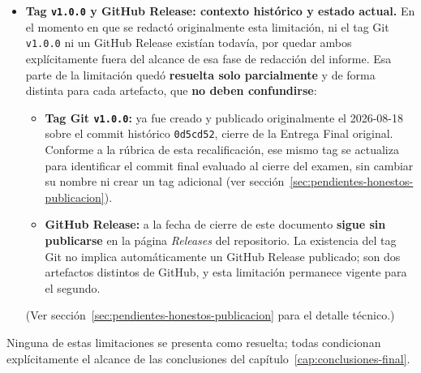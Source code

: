 \begin{itemize}[nosep]
    el diagrama de flujo ya fue regenerado con los tres bloques
    cuantificados; el \'unico gap que persiste es que Jaime no document\'o
    su conteo de candidatos evaluados/excluidos, se\~nalado con l\'inea
    punteada en el propio diagrama (cap\'itulo~\ref{cap:trabajos-relacionados}).
  \item \textbf{Tag \texttt{v1.0.0} y GitHub Release: contexto hist\'orico
    y estado actual.} En el momento en que se redact\'o originalmente esta
    limitaci\'on, ni el tag Git \texttt{v1.0.0} ni un GitHub Release
    exist\'ian todav\'ia, por quedar ambos expl\'icitamente fuera del
    alcance de esa fase de redacci\'on del informe. Esa parte de la
    limitaci\'on qued\'o \textbf{resuelta solo parcialmente} y de forma
    distinta para cada artefacto, que \textbf{no deben confundirse}:
    \begin{itemize}[nosep]
      \item \textbf{Tag Git \texttt{v1.0.0}:} ya fue creado y publicado
        originalmente el 2026-08-18 sobre el commit hist\'orico
        \texttt{0d5cd52}, cierre de la Entrega Final original. Conforme a
        la r\'ubrica de esta recalificaci\'on, ese mismo tag se actualiza
        para identificar el commit final evaluado al cierre del examen,
        sin cambiar su nombre ni crear un tag adicional (ver
        secci\'on~\ref{sec:pendientes-honestos-publicacion}).
      \item \textbf{GitHub Release:} a la fecha de cierre de este
        documento \textbf{sigue sin publicarse} en la p\'agina
        \emph{Releases} del repositorio. La existencia del tag Git no
        implica autom\'aticamente un GitHub Release publicado; son dos
        artefactos distintos de GitHub, y esta limitaci\'on permanece
        vigente para el segundo.
    \end{itemize}
    (Ver secci\'on~\ref{sec:pendientes-honestos-publicacion} para el
    detalle t\'ecnico.)
\end{itemize}

Ninguna de estas limitaciones se presenta como resuelta; todas condicionan
expl\'icitamente el alcance de las conclusiones del
cap\'itulo~\ref{cap:conclusiones-final}.
